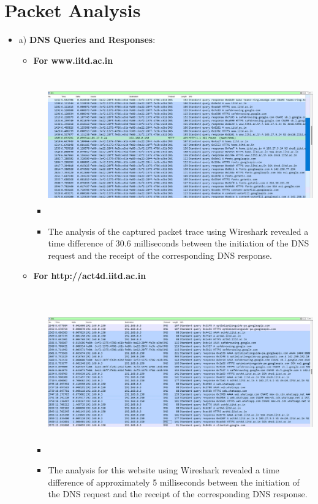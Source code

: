 \documentclass{article}
\begin{document}
\section*{Packet Analysis}
\begin{itemize}
    \item a) \textbf{DNS Queries and Responses}:
        \begin{itemize}
        \item \textbf{For www.iitd.ac.in}
           \begin{itemize}
             \item \includegraphics[width=15cm, height=6cm]
        {iitd-dns.jpeg}
            \item The analysis of the captured packet trace using Wireshark revealed a time difference of 30.6 milliseconds between the initiation of the DNS request and the receipt of the corresponding DNS response.
           \end{itemize}
        \item \textbf{For http://act4d.iitd.ac.in}
        \begin{itemize}
            \item \includegraphics[width=15cm, height=7cm]
            {act4d-dns.jpeg}
            \item The analysis for this website using Wireshark revealed a time difference of approximately 5 milliseconds between the initiation of the DNS request and the receipt of the corresponding DNS response.

\end{itemize}
\end{itemize}
\end{itemize}
\end{document}
